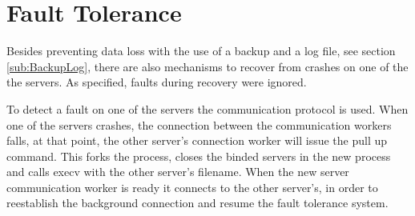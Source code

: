 \documentclass[12pt]{article} %
\begin{document}
\section{Fault Tolerance}
\label{sec:FaultTolerance}

Besides preventing data loss with the use of a backup and a log file, see section \ref{sub:BackupLog},
there are also mechanisms to recover from crashes on one of the the servers.
As specified, faults during recovery were ignored.

To detect a fault on one of the servers the communication protocol is used.
When one of the servers crashes, the connection between the communication
workers falls, at that point, the other server's connection worker will issue the pull
up command. This forks the process, closes the binded servers in the new process and
calls execv with the other server's filename. When the new server communication
worker is ready it connects to the other server's, in order
to reestablish the background connection and resume the fault tolerance system.

\end{document}
